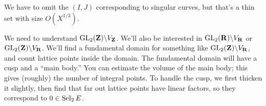 We have to omit the $(I,J)$ corresponding to singular curves, but that's a 
thin set with size $O(X^{1/3})$. 

We need to understand $\operatorname{GL}_2(\mathbf{Z})\backslash V_{\mathbf{Z}}$. We'll also be 
interested in $\operatorname{GL}_2(\mathbf{R})\backslash V_{\mathbf{R}}$ or $\operatorname{GL}_2(\mathbf{Z})\backslash V_{\mathbf{R}}$. 
We'll find a fundamental domain for something like 
$\operatorname{GL}_2(\mathbf{Z})\backslash V_{\mathbf{R}}$, and count lattice points inside the domain. 
The fundamental domain will have a cusp and a ``main body.'' You can estimate 
the volume of the main body; this gives (roughly) the number of integral 
points. To handle the cusp, we first thicken it slightly, then find that 
far out lattice points have linear factors, so they correspond to 
$0\in \operatorname{Sel}_2 E$. 





